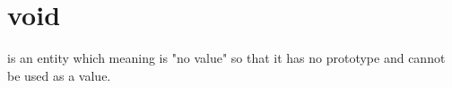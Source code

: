 \section{void}

 is an entity which meaning is "no value" so that it has no
prototype and cannot be used as a value.

